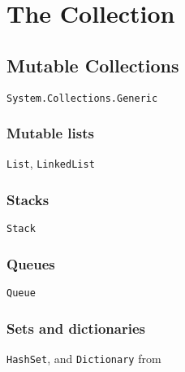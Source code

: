 \chapter{The Collection}

\section{Mutable Collections}
\verb|System.Collections.Generic|
\subsection{Mutable lists}
\verb|List|,  \verb|LinkedList|
\subsection{Stacks}
\verb|Stack|
\subsection{Queues}  
\verb|Queue|
\subsection{Sets and dictionaries}
\verb|HashSet|,  and \verb|Dictionary| from  

